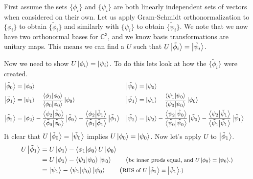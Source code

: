 \documentclass[boxes,pages]{homework}
\begin{document}
\begin{solution}
	First assume the sets $\{\phi_i\}$ and $\{\psi_i\}$ are both linearly independent sets of vectors when considered on their own. Let us apply Gram-Schmidt orthonormalization to $\{\phi_i\}$ to obtain $\{\tilde{\phi}_i\}$ and similarly with $\{\psi_i\}$ to obtain $\{\tilde{\psi}_i\}$. We note that we now have two orthonormal bases for $\mathbb{C}^3$, and we know basis transformations are unitary maps. This means we can find a $U$ such that $U\ket{\tilde{\phi}_i} = \ket{\tilde{\psi}_i}$.

	Now we need to show $U\ket{\phi_i} = \ket{\psi_i}$. To do this lets look at how the $\{\tilde{\phi}_i\}$ were created.
	\begin{align*}
		\ket{\tilde{\phi}_0} & = \ket{\phi_0}                                                                       & \ket{\tilde{\psi}_0} & = \ket{\psi_0}                                                                       &   \\
		\ket{\tilde{\phi}_1} & = \ket{\phi_1} - \frac{\braket{\phi_1}{\phi_0}}{\braket{\phi_0}{\phi_0}}\ket{\phi_0} & \ket{\tilde{\psi}_1} & = \ket{\psi_1} - \frac{\braket{\psi_1}{\psi_0}}{\braket{\psi_0}{\psi_0}}\ket{\psi_0} &   \\
		\ket{\tilde{\phi}_2} & = \ket{\phi_2} - \frac{\braket{\phi_2}{\tilde{\phi}_0}}{\braket{\tilde{\phi}_0}{\tilde{\phi}_0}}\ket{\tilde{\phi}_0} - \frac{\braket{\phi_2}{\tilde{\phi}_1}}{\braket{\tilde{\phi}_1}{\tilde{\phi}_1}}\ket{\tilde{\phi}_1} & \ket{\tilde{\psi}_2} & = \ket{\psi_2} - \frac{\braket{\psi_2}{\tilde{\psi}_0}}{\braket{\tilde{\psi}_0}{\tilde{\psi}_0}}\ket{\tilde{\psi}_0} - \frac{\braket{\psi_2}{\tilde{\psi}_1}}{\braket{\tilde{\psi}_1}{\tilde{\psi}_1}}\ket{\tilde{\psi}_1}
	\end{align*}
	It clear that $U\ket{\tilde{\phi}_0} = \ket{\tilde{\psi}_0}$ implies $U\ket{\phi_0} = \ket{\psi_0}$. Now let's apply $U$ to $\ket{\tilde{\phi}_1}$.
	\begin{align*}
		U\ket{\tilde{\phi}_1} & = U\ket{\phi_1} - \braket{\phi_1}{\phi_0}U\ket{\phi_0}                                                                               \\
		                      & = U\ket{\phi_1} - \braket{\psi_1}{\psi_0}\ket{\psi_0} \tag{\footnotesize{bc inner prods equal, and $U\ket{\phi_0} = \ket{\psi_0}$.}} \\
		                      & = \ket{\psi_1} - \braket{\psi_1}{\psi_0}\ket{\psi_0} \tag{\footnotesize{RHS of $U\ket{\tilde{\phi}_1} = \ket{\tilde{\psi}_1}$.}}

\end{align*}
\end{solution}
\end{document}
